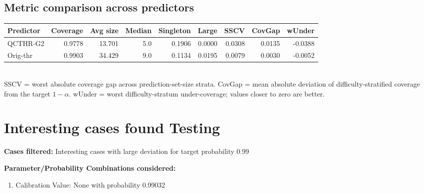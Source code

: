 \documentclass[parskip=half]{scrartcl}
\begin{document}
\subsection{Metric comparison across predictors}
\begin{tabular}{l r r r r r r r r}
\hline
Predictor & Coverage & Avg size & Median & Singleton & Large & SSCV & CovGap & wUnder \\
\hline
QCTHR-G2 & 0.9778 & 13.701 & 5.0 & 0.1906 & 0.0000 & 0.0308 & 0.0135 & -0.0388 \\
Orig-thr & 0.9903 & 34.429 & 9.0 & 0.1134 & 0.0195 & 0.0079 & 0.0030 & -0.0052 \\
\hline
\end{tabular}\\[0.5em]
\textsf{\scriptsize SSCV = worst absolute coverage gap across prediction-set-size strata. CovGap = mean absolute deviation of difficulty-stratified coverage from the target $1-\alpha$. wUnder = worst difficulty-stratum under-coverage; values closer to zero are better.}\\
\section{Interesting cases found Testing}
\textbf{Cases filtered:} Interesting cases with large deviation for target probability 0.99


\textbf{Parameter/Probability Combinations considered:}\begin{enumerate}
\item Calibration Value: None with probability 0.99032
\end{enumerate}
        
\end{document}
